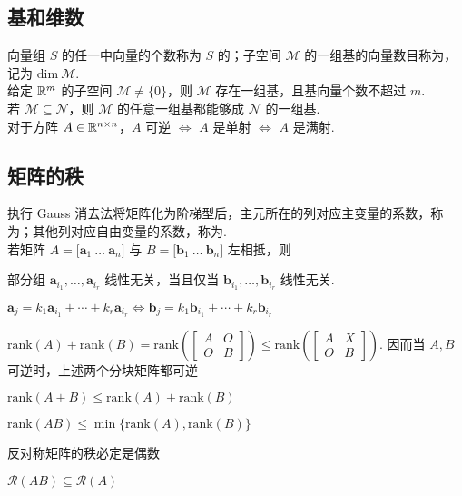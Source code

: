 \documentclass[./main.tex]{subfiles}
\begin{document}
\subsection{基和维数}
向量组 $S$ 的任一中向量的个数称为 $S$ 的；子空间 $\mathcal{M}$ 的一组基的向量数目称为，记为 $\mathrm{dim}\ \mathcal{M}$. \\

给定 $\mathbb{R}^{m}$ 的子空间 $\mathcal{M}\neq\{0\}$，则 $\mathcal{M}$ 存在一组基，且基向量个数不超过 $m$. \\

若 $\mathcal{M}\subseteq\mathcal{N}$，则 $\mathcal{M}$ 的任意一组基都能够成 $\mathcal{N}$ 的一组基. \\

对于方阵 $A\in\mathbb{R}^{n\times n}$，$A$ 可逆 $\iff$ $A$ 是单射 $\iff$ $A$ 是满射.

\subsection{矩阵的秩}
执行 Gauss 消去法将矩阵化为阶梯型后，主元所在的列对应主变量的系数，称为；其他列对应自由变量的系数，称为. \\

若矩阵 $A=\big[\bm{a}_1\ \dots\ \bm{a}_n\big]$ 与 $B=\big[\bm{b}_1\ \dots\ \bm{b}_n\big]$ 左相抵，则

\begin{enumerate*}
    \item 部分组 $\bm{a}_{i_1},\dots,\bm{a}_{i_r}$ 线性无关，当且仅当 $\bm{b}_{i_1},\dots,\bm{b}_{i_r}$ 线性无关.
    \item $\bm{a}_j=k_1\bm{a}_{i_1}+\cdots+k_r\bm{a}_{i_r}\iff\bm{b}_j=k_1\bm{b}_{i_1}+\cdots+k_r\bm{b}_{i_r}$
\end{enumerate*}

\begin{itemize*}
    \item $\mathrm{rank}(A)+\mathrm{rank}(B)=\mathrm{rank}\left(\begin{bmatrix}A &O\\ O &B\end{bmatrix}\right)\le\mathrm{rank}\left(\begin{bmatrix}A &X\\ O &B\end{bmatrix}\right)$. 因而当 $A,B$ 可逆时，上述两个分块矩阵都可逆
    \item $\mathrm{rank}(A+B)\le\mathrm{rank}(A)+\mathrm{rank}(B)$
    \item $\mathrm{rank}(AB)\le\min\{\mathrm{rank}(A),\mathrm{rank}(B)\}$
    \item 反对称矩阵的秩必定是偶数
    \item $\mathcal{R}(AB)\subseteq\mathcal{R}(A)$
\end{itemize*}
\end{document}
